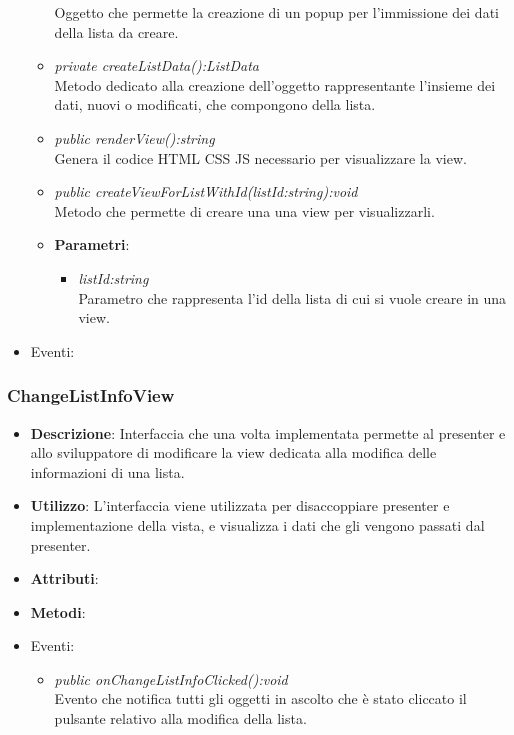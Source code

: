 \begin{itemize}
\begin{itemize}
{\begin{itemize}
				Oggetto che permette la creazione di un popup per l'immissione dei dati della lista da creare.	
			\end{itemize}}
	\item \textit{private createListData():ListData}\\
	 	Metodo dedicato alla creazione dell'oggetto rappresentante l'insieme dei dati, nuovi o modificati, che compongono della lista.
	\item \textit{public renderView():string}\\
	Genera il codice HTML CSS JS necessario per visualizzare la view.
	\item \textit{public createViewForListWithId(listId:string):void}\\
		Metodo che permette di creare una una view per visualizzarli.
			\item{\textbf{Parametri}: \begin{itemize}
			\item \textit{listId:string}\\
			Parametro che rappresenta l'id della lista di cui si vuole creare in una view.
			\end{itemize}}
	\end{itemize}
\item{Eventi}:
\end{itemize}

\subsubsection{ChangeListInfoView}
\begin{itemize}
\item \textbf{Descrizione}: Interfaccia che una volta implementata permette al presenter e allo sviluppatore di modificare la view dedicata alla modifica delle informazioni di una lista.
\item \textbf{Utilizzo}: L'interfaccia viene utilizzata per disaccoppiare presenter e implementazione della vista, e visualizza i dati che gli vengono passati dal presenter.
\item \textbf{Attributi}: 
\item \textbf{Metodi}:
\item{Eventi}:
	\begin{itemize}	
	\item \textit{public onChangeListInfoClicked():void}\\
		Evento che notifica tutti gli oggetti in ascolto che è stato cliccato il pulsante relativo alla modifica della lista.
	\end{itemize}
\end{itemize}

